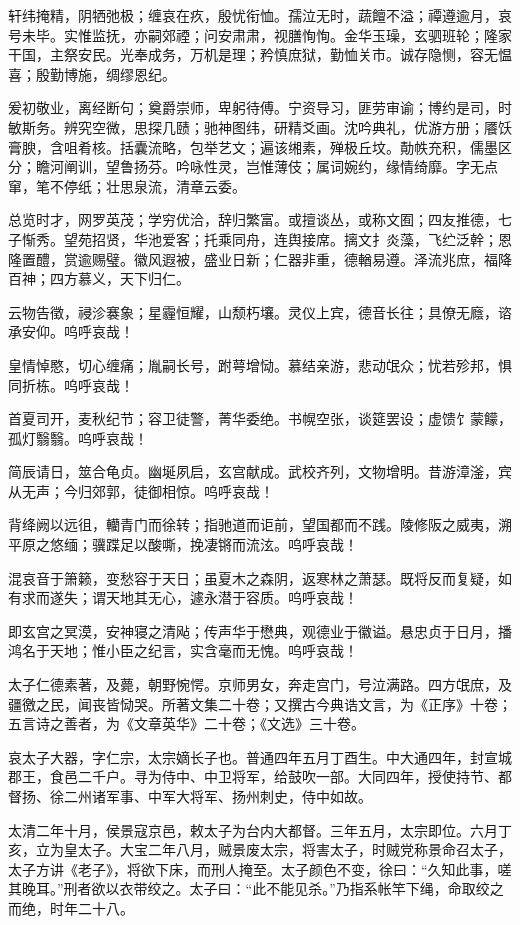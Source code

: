 \documentclass[12pt,UTF8]{ctexbook}
\begin{document}
轩纬掩精，阴牺弛极；缠哀在疚，殷忧衔恤。孺泣无时，蔬饘不溢；禫遵逾月，哀号未毕。实惟监抚，亦嗣郊禋；问安肃肃，视膳恂恂。金华玉璪，玄驷班轮；隆家干国，主祭安民。光奉成务，万机是理；矜慎庶狱，勤恤关市。诚存隐恻，容无愠喜；殷勤博施，绸缪恩纪。

爰初敬业，离经断句；奠爵崇师，卑躬待傅。宁资导习，匪劳审谕；博约是司，时敏斯务。辨究空微，思探几赜；驰神图纬，研精爻画。沈吟典礼，优游方册；餍饫膏腴，含咀肴核。括囊流略，包举艺文；遍该缃素，殚极丘坟。勣帙充积，儒墨区分；瞻河阐训，望鲁扬芬。吟咏性灵，岂惟薄伎；属词婉约，缘情绮靡。字无点窜，笔不停纸；壮思泉流，清章云委。

总览时才，网罗英茂；学穷优洽，辞归繁富。或擅谈丛，或称文囿；四友推德，七子惭秀。望苑招贤，华池爱客；托乘同舟，连舆接席。摛文扌炎藻，飞纻泛幹；恩隆置醴，赏逾赐璧。徽风遐被，盛业日新；仁器非重，德輶易遵。泽流兆庶，福降百神；四方慕义，天下归仁。

云物告徵，祲沴褰象；星霾恒耀，山颓朽壤。灵仪上宾，德音长往；具僚无廕，谘承安仰。呜呼哀哉！

皇情悼愍，切心缠痛；胤嗣长号，跗萼增恸。慕结亲游，悲动氓众；忧若殄邦，惧同折栋。呜呼哀哉！

首夏司开，麦秋纪节；容卫徒警，菁华委绝。书幌空张，谈筵罢设；虚馈饣蒙饛，孤灯翳翳。呜呼哀哉！

简辰请日，筮合龟贞。幽埏夙启，玄宫献成。武校齐列，文物增明。昔游漳滏，宾从无声；今归郊郭，徒御相惊。呜呼哀哉！

背绛阙以远徂，轥青门而徐转；指驰道而讵前，望国都而不践。陵修阪之威夷，溯平原之悠缅；骥蹀足以酸嘶，挽凄锵而流泫。呜呼哀哉！

混哀音于箫籁，变愁容于天日；虽夏木之森阴，返寒林之萧瑟。既将反而复疑，如有求而遂失；谓天地其无心，遽永潜于容质。呜呼哀哉！

即玄宫之冥漠，安神寝之清飐；传声华于懋典，观德业于徽谥。悬忠贞于日月，播鸿名于天地；惟小臣之纪言，实含毫而无愧。呜呼哀哉！

太子仁德素著，及薨，朝野惋愕。京师男女，奔走宫门，号泣满路。四方氓庶，及疆徼之民，闻丧皆恸哭。所著文集二十卷；又撰古今典诰文言，为《正序》十卷；五言诗之善者，为《文章英华》二十卷；《文选》三十卷。

哀太子大器，字仁宗，太宗嫡长子也。普通四年五月丁酉生。中大通四年，封宣城郡王，食邑二千户。寻为侍中、中卫将军，给鼓吹一部。大同四年，授使持节、都督扬、徐二州诸军事、中军大将军、扬州刺史，侍中如故。

太清二年十月，侯景寇京邑，敕太子为台内大都督。三年五月，太宗即位。六月丁亥，立为皇太子。大宝二年八月，贼景废太宗，将害太子，时贼党称景命召太子，太子方讲《老子》，将欲下床，而刑人掩至。太子颜色不变，徐曰：“久知此事，嗟其晚耳。”刑者欲以衣带绞之。太子曰：“此不能见杀。”乃指系帐竿下绳，命取绞之而绝，时年二十八。
\end{document}
